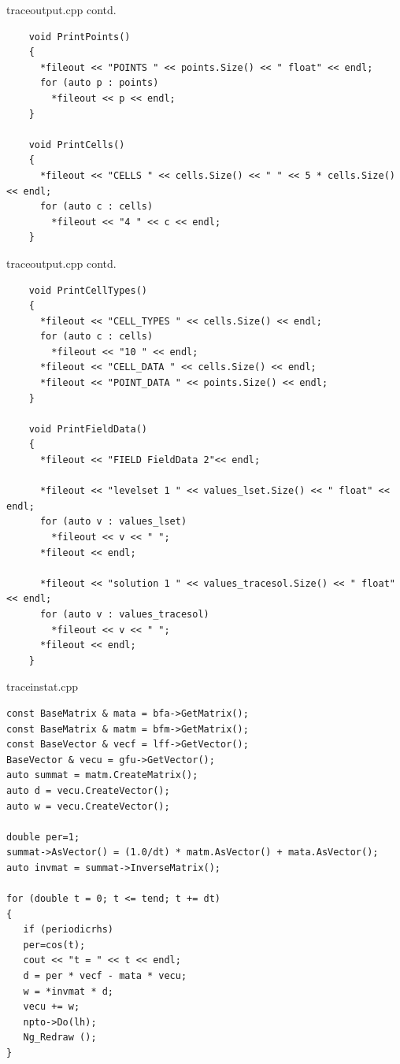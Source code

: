 \documentclass[11pt]{beamer}
\theoremstyle{plain}
\theoremstyle{definition}
\theoremstyle{remark}
\begin{document}
\begin{frame}[fragile]{traceoutput.cpp contd.}
	\begin{lstlisting}
    void PrintPoints()
    {
      *fileout << "POINTS " << points.Size() << " float" << endl;
      for (auto p : points)
        *fileout << p << endl;
    }

    void PrintCells()
    {
      *fileout << "CELLS " << cells.Size() << " " << 5 * cells.Size() << endl;
      for (auto c : cells)
        *fileout << "4 " << c << endl;
    }

	\end{lstlisting}
\end{frame}
\begin{frame}[fragile]{traceoutput.cpp contd.}
	\begin{lstlisting}
    void PrintCellTypes()
    {
      *fileout << "CELL_TYPES " << cells.Size() << endl;
      for (auto c : cells)
        *fileout << "10 " << endl;
      *fileout << "CELL_DATA " << cells.Size() << endl;
      *fileout << "POINT_DATA " << points.Size() << endl;
    }

    void PrintFieldData()
    {
      *fileout << "FIELD FieldData 2"<< endl;

      *fileout << "levelset 1 " << values_lset.Size() << " float" << endl;
      for (auto v : values_lset)
        *fileout << v << " ";
      *fileout << endl;

      *fileout << "solution 1 " << values_tracesol.Size() << " float" << endl;
      for (auto v : values_tracesol)
        *fileout << v << " ";
      *fileout << endl;
    }	
	\end{lstlisting}
\end{frame}


\begin{frame}[fragile]{traceinstat.cpp}
	\begin{lstlisting}
const BaseMatrix & mata = bfa->GetMatrix();
const BaseMatrix & matm = bfm->GetMatrix();
const BaseVector & vecf = lff->GetVector();
BaseVector & vecu = gfu->GetVector();
auto summat = matm.CreateMatrix();
auto d = vecu.CreateVector();
auto w = vecu.CreateVector();
		
double per=1;
summat->AsVector() = (1.0/dt) * matm.AsVector() + mata.AsVector();
auto invmat = summat->InverseMatrix();

for (double t = 0; t <= tend; t += dt)
{
   if (periodicrhs)
   per=cos(t);
   cout << "t = " << t << endl;
   d = per * vecf - mata * vecu;
   w = *invmat * d;
   vecu += w;
   npto->Do(lh);
   Ng_Redraw ();	  
}
	\end{lstlisting}
\end{frame}
\end{document}
